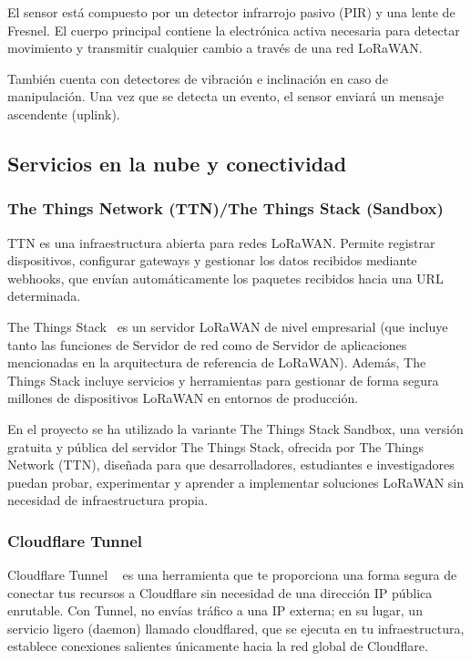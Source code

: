 El sensor está compuesto por un detector infrarrojo pasivo (PIR) y una lente de Fresnel. El cuerpo principal contiene la electrónica activa necesaria para detectar movimiento y transmitir cualquier cambio a través de una red LoRaWAN.

También cuenta con detectores de vibración e inclinación en caso de manipulación. Una vez que se detecta un evento, el sensor enviará un mensaje ascendente (uplink).



\subsection{Servicios en la nube y conectividad}
\subsubsection{The Things Network (TTN)/The Things Stack (Sandbox)}
TTN es una infraestructura abierta para redes LoRaWAN. Permite registrar dispositivos, configurar gateways y gestionar los datos recibidos mediante webhooks, que envían automáticamente los paquetes recibidos hacia una URL determinada.


The Things Stack~\cite{TTN:TTS} es un servidor LoRaWAN de nivel empresarial (que incluye tanto las funciones de Servidor de red como de Servidor de aplicaciones mencionadas en la arquitectura de referencia de LoRaWAN). Además, The Things Stack incluye servicios y herramientas para gestionar de forma segura millones de dispositivos LoRaWAN en entornos de producción.

En el proyecto se ha utilizado la variante The Things Stack Sandbox, una versión gratuita y pública del servidor The Things Stack, ofrecida por The Things Network (TTN), diseñada para que desarrolladores, estudiantes e investigadores puedan probar, experimentar y aprender a implementar soluciones LoRaWAN sin necesidad de infraestructura propia.


\subsubsection{Cloudflare Tunnel}
Cloudflare Tunnel ~\cite{CDF:tun} es una herramienta que te proporciona una forma segura de conectar tus recursos a Cloudflare sin necesidad de una dirección IP pública enrutable. Con Tunnel, no envías tráfico a una IP externa; en su lugar, un servicio ligero (daemon) llamado cloudflared, que se ejecuta en tu infraestructura, establece conexiones salientes únicamente hacia la red global de Cloudflare.

